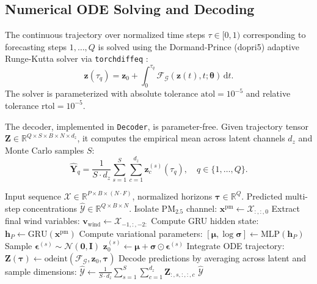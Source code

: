 \documentclass[conference]{IEEEtran}
\begin{document}
\subsection{Numerical ODE Solving and Decoding}
The continuous trajectory over normalized time steps $\tau \in [0, 1)$ corresponding to forecasting steps $1, \dots, Q$ is solved using the Dormand-Prince (dopri5) adaptive Runge-Kutta solver \cite{dormand1980dopri5} via \texttt{torchdiffeq} \cite{chen2018torchdiffeq}:
\begin{equation}
\boldsymbol{z}(\tau_q) = \boldsymbol{z}_0 + \int_{0}^{\tau_q} \mathcal{F}_{\mathcal{G}}(\boldsymbol{z}(t), t; \boldsymbol{\theta}) \, \mathrm{d}t.
\label{eq:diffeq_integral}
\end{equation}
The solver is parameterized with absolute tolerance $\text{atol} = 10^{-5}$ and relative tolerance $\text{rtol} = 10^{-5}$.

The decoder, implemented in \texttt{Decoder}, is parameter-free. Given trajectory tensor $\boldsymbol{Z} \in \mathbb{R}^{Q \times S \times B \times N \times d_z}$, it computes the empirical mean across latent channels $d_z$ and Monte Carlo samples $S$:
\begin{equation}
\widehat{\boldsymbol{Y}}_q = \frac{1}{S \cdot d_z} \sum_{s=1}^S \sum_{c=1}^{d_z} \boldsymbol{z}_c^{(s)}(\tau_q), \quad q \in \{1, \dots, Q\}.
\label{eq:decoder}
\end{equation}

\begin{algorithm}[t]
\caption{AtmoFuseNet Forward Pass}
\label{alg:forward}
\begin{algorithmic}[1]
\REQUIRE Input sequence $\boldsymbol{\mathcal{X}} \in \mathbb{R}^{P \times B \times (N \cdot F)}$, normalized horizons $\boldsymbol{\tau} \in \mathbb{R}^Q$.
\ENSURE Predicted multi-step concentrations $\widehat{\boldsymbol{\mathcal{Y}}} \in \mathbb{R}^{Q \times B \times N}$.
\STATE Isolate $\text{PM}_{2.5}$ channel: $\boldsymbol{x}^{\text{pm}} \leftarrow \boldsymbol{\mathcal{X}}_{:, :, 0}$
\STATE Extract final wind variables: $\boldsymbol{v}_{\text{wind}} \leftarrow \boldsymbol{\mathcal{X}}_{-1, :, -2:}$
\STATE Compute GRU hidden state: $\boldsymbol{h}_P \leftarrow \mathrm{GRU}(\boldsymbol{x}^{\text{pm}})$
\STATE Compute variational parameters: $[\boldsymbol{\mu}, \log \boldsymbol{\sigma}] \leftarrow \mathrm{MLP}(\boldsymbol{h}_P)$
    \STATE Sample $\boldsymbol{\epsilon}^{(s)} \sim \mathcal{N}(\mathbf{0}, \boldsymbol{I})$
    \STATE $\boldsymbol{z}_0^{(s)} \leftarrow \boldsymbol{\mu} + \boldsymbol{\sigma} \odot \boldsymbol{\epsilon}^{(s)}$
\ENDFOR
\STATE Integrate ODE trajectory: $\boldsymbol{Z}(\boldsymbol{\tau}) \leftarrow \mathrm{odeint}(\mathcal{F}_{\mathcal{G}}, \boldsymbol{z}_0, \boldsymbol{\tau})$
\STATE Decode predictions by averaging across latent and sample dimensions:
\STATE $\widehat{\boldsymbol{\mathcal{Y}}} \leftarrow \frac{1}{S \cdot d_z} \sum_{s=1}^S \sum_{c=1}^{d_z} \boldsymbol{Z}_{:, s, :, :, c}$
\RETURN $\widehat{\boldsymbol{\mathcal{Y}}}$
\end{algorithmic}
\end{algorithm}
\end{document}
